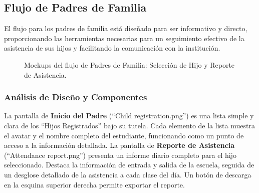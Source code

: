 \subsection{ Flujo de Padres de Familia}
\begin{samepage}\small
El flujo para los padres de familia está diseñado para ser informativo y directo, proporcionando las herramientas necesarias para un seguimiento efectivo de la asistencia de sus hijos y facilitando la comunicación con la institución.
\begin{figure}[H]
	\centering
	\caption{Mockups del flujo de Padres de Familia: Selección de Hijo y Reporte de Asistencia.}\label{fig:mk-parents-flow}
\end{figure}
	\subsubsection*{Análisis de Diseño y Componentes}
	La pantalla de \textbf{Inicio del Padre} (``Child registration.png'') es una lista simple y clara de los ``Hijos Registrados'' bajo su tutela. Cada elemento de la lista muestra el avatar y el nombre completo del estudiante, funcionando como un punto de acceso a la información detallada. La pantalla de \textbf{Reporte de Asistencia} (``Attendance report.png'') presenta un informe diario completo para el hijo seleccionado. Destaca la información de entrada y salida de la escuela, seguida de un desglose detallado de la asistencia a cada clase del día. Un botón de descarga en la esquina superior derecha permite exportar el reporte.
    

\end{samepage}
